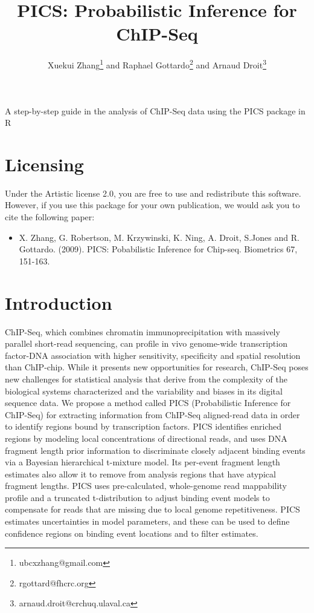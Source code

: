 \documentclass[a4paper]{article}
\title{PICS: Probabilistic Inference for ChIP-Seq}
\author{Xuekui Zhang\footnote{ubcxzhang@gmail.com} and Raphael
  Gottardo\footnote{rgottard@fhcrc.org} and Arnaud Droit\footnote{arnaud.droit@crchuq.ulaval.ca}}
\begin{document}
\maketitle



\textnormal {\normalfont}
A step-by-step guide in the analysis of ChIP-Seq data using the PICS package in R

\tableofcontents
\newpage


\section{Licensing}

Under the Artistic license 2.0, you are free to use and redistribute this software. However, if you use this package for your own publication, we would ask you to cite the following paper:

\begin{itemize}
\item[] X. Zhang, G. Robertson, M. Krzywinski, K. Ning, A. Droit, S.Jones and R. Gottardo. (2009). PICS: Pobabilistic Inference for Chip-seq. Biometrics 67, 151-163.
\end{itemize}


\section{Introduction}
ChIP-Seq, which combines chromatin immunoprecipitation with massively parallel
short-read sequencing, can profile in vivo genome-wide transcription
factor-DNA association with higher sensitivity, specificity and spatial
resolution than ChIP-chip. While it presents new opportunities for research,
ChIP-Seq poses new challenges for statistical analysis that derive from the
complexity of the biological systems characterized and the variability and
biases in its digital sequence data. We propose a method called PICS
(Probabilistic Inference for ChIP-Seq) for extracting information from
ChIP-Seq aligned-read data in order to identify regions bound by transcription
factors. PICS identifies enriched regions by modeling local concentrations of
directional reads, and uses DNA fragment length prior information to
discriminate closely adjacent binding events via a Bayesian hierarchical
t-mixture model. Its per-event fragment length estimates also allow it to
remove from analysis regions that have atypical fragment lengths. PICS uses
pre-calculated, whole-genome read mappability profile and a truncated
t-distribution to adjust binding event models to compensate for reads that are
missing due to local genome repetitiveness. PICS estimates uncertainties in
model parameters, and these can be used to define confidence regions on binding event locations and to filter estimates. 
\end{document}
